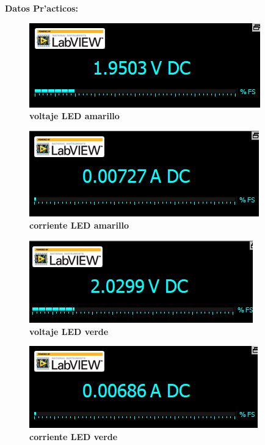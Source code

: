 \documentclass[11pt, letterpaper]{report}
\newcommand{\Center}[1]{
	\begin{center}
		#1
	\end{center}
} %
\newcommand{\Page}[3][c]{
	\begin{minipage}[#1]{#2\textwidth}
		#3
	\end{minipage}
}
\newenvironment{block}[1]{\hspace{-0.8 cm}\textbf{\Large #1}}{\vspace{3 mm}} %
\begin{document}
	\begin{block}{Datos Pr'acticos:}
		
		\vspace*{.5cm}
		\Page{.5}{
			\begin{figure}[H]
				\Center{
					\includegraphics[scale=.5]{vamarillo.png}
					\caption{\textbf{voltaje LED amarillo}}
				}
			\end{figure}
		}
		\Page{.5}{
			\begin{figure}[H]
				\Center{
					\includegraphics[scale=.5]{iamarillo.png}
					\caption{\textbf{corriente LED amarillo}}
				}
			\end{figure}
		}
	
		\Page{.5}{
			\begin{figure}[H]
				\Center{
					\includegraphics[scale=.5]{vverde.png}
					\caption{\textbf{voltaje LED verde}}
				}
			\end{figure}
		}
		\Page{.5}{
			\begin{figure}[H]
				\Center{
					\includegraphics[scale=.5]{iverde.png}
					\caption{\textbf{corriente LED verde}}
				}
			\end{figure}
		}
	

\end{block}
\end{document}
